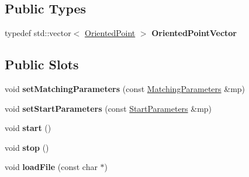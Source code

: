 \subsection*{Public Types}
\begin{DoxyCompactItemize}
\item 
\mbox{\label{classGMapping_1_1QParticleViewer_a063d584e9f97a15dc53fe7bb9013948a}} 
typedef std\+::vector$<$ \hyperlink{structGMapping_1_1orientedpoint}{Oriented\+Point} $>$ {\bfseries Oriented\+Point\+Vector}
\end{DoxyCompactItemize}
\subsection*{Public Slots}
\begin{DoxyCompactItemize}
\item 
\mbox{\label{classGMapping_1_1QParticleViewer_a3b806644bf1e812ccb5d6edebdaaea52}} 
void {\bfseries set\+Matching\+Parameters} (const \hyperlink{structGMapping_1_1QParticleViewer_1_1MatchingParameters}{Matching\+Parameters} \&mp)
\item 
\mbox{\label{classGMapping_1_1QParticleViewer_a328f4fb99c23bc3150dc6655a235e1c3}} 
void {\bfseries set\+Start\+Parameters} (const \hyperlink{structGMapping_1_1QParticleViewer_1_1StartParameters}{Start\+Parameters} \&mp)
\item 
\mbox{\label{classGMapping_1_1QParticleViewer_a46fc03d1850c0772713af5f298b7267c}} 
void {\bfseries start} ()
\item 
\mbox{\label{classGMapping_1_1QParticleViewer_ab003530245791ce989f819fbf119f3fb}} 
void {\bfseries stop} ()
\item 
\mbox{\label{classGMapping_1_1QParticleViewer_a41549076ebb97cf5bccc44ae44cfa0f2}} 
void {\bfseries load\+File} (const char $\ast$)
\end{DoxyCompactItemize}

